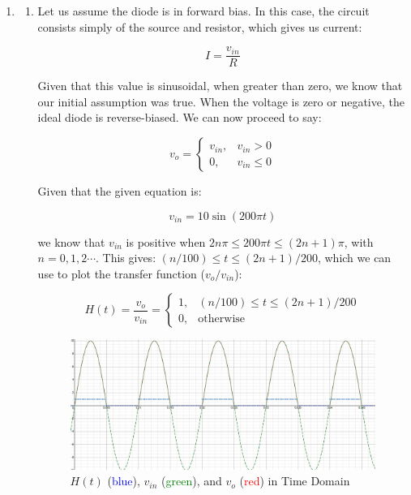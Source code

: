 \begin{enumerate}

  \item

    \begin{enumerate}

      \item 

        Let us assume the diode is in forward bias. In this case, the circuit consists simply of the source and resistor, which gives us current:

        $$I=\frac{v_{in}}{R}$$

        Given that this value is  sinusoidal, when greater than zero, we know that our initial assumption was true. When the voltage is zero or negative, the ideal diode is reverse-biased. We can now proceed to say:

        $$v_o=\left\{\begin{array}{ll} v_{in}, & v_{in}>0\\ 0, & v_{in}\leq 0\end{array}$$

          Given that the given equation is:

          $$v_{in}=10\sin(200\pi t)$$

          we know that $v_{in}$ is positive when $2n\pi\leq 200\pi t\leq (2n+1)\pi$, with $n=0,1,2\cdots$. This gives: $(n/100)\leq t\leq (2n+1)/200$, which we can use to plot the transfer function ($v_o/v_{in}$):

          $$H(t)=\frac{v_o}{v_{in}}=\left\{\begin{array}{ll} 1, & (n/100)\leq t\leq (2n+1)/200\\ 0, & \text{otherwise}\end{array}$$

            \begin{figure}[H]
              \centering
              \includegraphics[width=.9\textwidth]{Figures/HW4-1a}
              \caption{$H(t)$ (\textcolor{blue}{blue}), $v_{in}$ (\textcolor{green}{green}), and $v_{o}$ (\textcolor{red}{red}) in Time Domain}
              \label{fig:1}
            \end{figure}


\end{enumerate}
\end{enumerate}
